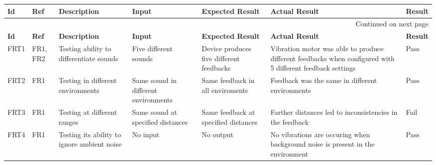 \documentclass[12pt, titlepage]{article}
\begin{document}
\begin{longtable}{|p{1.2cm}|p{0.9cm}|p{2.5cm}|p{1.5cm}|p{2.5cm}|p{2cm}|p{1.2cm}|}

  \endfirsthead
  \hline
  \textbf{Id} & \textbf{Ref} & \textbf{Description}                                                         & \textbf{Input}                                    & \textbf{Expected Result}                                    & \textbf{Actual Result} & \textbf{Result}                                    \\ \hline

  \endhead

  \hline \multicolumn{7}{|r|}{Continued on next page} \\ \hline
  \endfoot
   
\endlastfoot


  \hline
  \textbf{Id} & \textbf{Ref} & \textbf{Description}                                                         & \textbf{Input}                                    & \textbf{Expected Result}                                    & \textbf{Actual Result} & \textbf{Result}                                    \\ \hline
  FRT1        & FR1, FR2     & Testing ability to differentiate sounds                                     & Five different sounds                             & Device produces five different feedbacks                    &           Vibration motor was able to produce different feedbacks when configured with 5 different feedback settings              & {\color[HTML]{32CB00} Pass}                        \\ \hline
  FRT2        & FR1          & Testing in different environments                                            & Same sound in different environments              & Same feedback in all enviroments                            &          Feedback was the same in different environments              &         {\color[HTML]{32CB00} Pass}                \\ \hline
  FRT3        & FR1          & Testing at different ranges                                                  & Same sound at specified distances                 & Same feedback at specified distances                        &          Farther distances led to inconsistencies in the feedback              &  {\color[HTML]{FE0000} Fail} \\ \hline
  FRT4        & FR1          & Testing its ability to ignore ambient noise                                  & No input                                          & No output                                                   &          No vibrations are occuring when background noise is present in the environment              &       {\color[HTML]{32CB00} Pass}                                             \\ \hline

\end{longtable}
\end{document}
